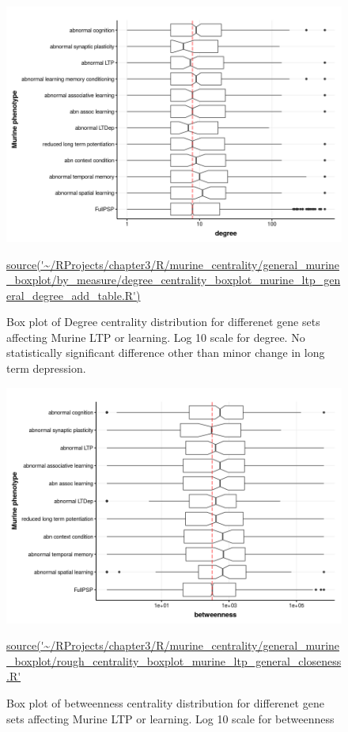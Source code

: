 \begin{figure}
    \centering
    \includegraphics[width=\textwidth]{images/chapter3/ggplot2/murine_centrality_boxplot/add_theme/addLTP/Rplot_murine_degree_ltp.png}
    \caption{Box plot of Degree centrality distribution for differenet gene sets affecting Murine LTP or learning. Log 10 scale for degree. No statistically significant difference other than minor change in long term depression.} 
    \tiny\url{source('~/RProjects/chapter3/R/murine_centrality/general_murine_boxplot/by_measure/degree_centrality_boxplot_murine_ltp_general_degree_add_table.R')}
    \label{fig:murine_ltp_centrality_boxplot_degree1}
\end{figure}





\begin{figure}
    \centering
    \includegraphics[width=\textwidth]{images/chapter3/ggplot2/murine_centrality_boxplot/add_theme/addLTP/Rplot_betweenness_edit.png}
    \caption{Box plot of betweenness centrality distribution for differenet gene sets affecting Murine LTP or learning. Log 10 scale for betweenness} 
    \tiny\url{source('~/RProjects/chapter3/R/murine_centrality/general_murine_boxplot/rough_centrality_boxplot_murine_ltp_general_closeness.R'}
    \label{fig:murine_ltp_centrality_boxplot_betweenness}
\end{figure}

